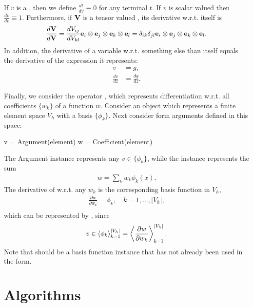 If $v$ is a , then we define $\frac{d t}{d v} \equiv
0$ for any terminal $t$. If $v$ is scalar valued then $\frac{d v}{d v}
\equiv 1$. Furthermore, if $\mathbf{V}$ is a tensor valued ,
its derivative w.r.t. itself is
\begin{align}
\frac{d \mathbf{V}}{d \mathbf{V}}
    =
    \frac{d V_{ij}}{d V_{kl}}
    \mathbf{e}_i\otimes\mathbf{e}_j\otimes\mathbf{e}_k\otimes\mathbf{e}_l
    =
    \delta_{ik}\delta_{jl}
    \mathbf{e}_i\otimes\mathbf{e}_j\otimes\mathbf{e}_k\otimes\mathbf{e}_l .
\end{align}
In addition, the derivative of a variable w.r.t. something else than
itself equals the derivative of the expression it represents:
\begin{align}
v &= g, \\
\frac{d v}{d z} &= \frac{d g}{d z}.
\end{align}

Finally, we consider the operator , which represents
differentiation w.r.t. all coefficients $\{w_k\}$ of a function $w$.
Consider an object  which represents a finite element
space $V_h$ with a basis $\{\phi_k\}$.  Next consider form arguments
defined in this space:
\begin{python}
v = Argument(element)
w = Coefficient(element)
\end{python}
The Argument instance  represents any $v\in\{\phi_k\}$,
while the  instance  represents the sum
\begin{align}
w = \sum_k w_k \phi_k(x).
\end{align}
The derivative of  w.r.t. any $w_k$ is the corresponding basis function in $V_h$,
\begin{align}
\frac{\partial w}{\partial w_k} = \phi_k, \quad k = 1, \ldots, |V_h|, \\
\end{align}
which can be represented by , since
\begin{align}
v \in \left\langle{ \phi_k }\right\rangle_{k=1}^{|V_h|} = \left\langle{ \frac{\partial w}{\partial w_k} }\right\rangle_{k=1}^{|V_h|}.
\end{align}
Note that  should be a basis function instance that has not
already been used in the form.

\section{Algorithms}
\label{ufl:sec:algorithms}

